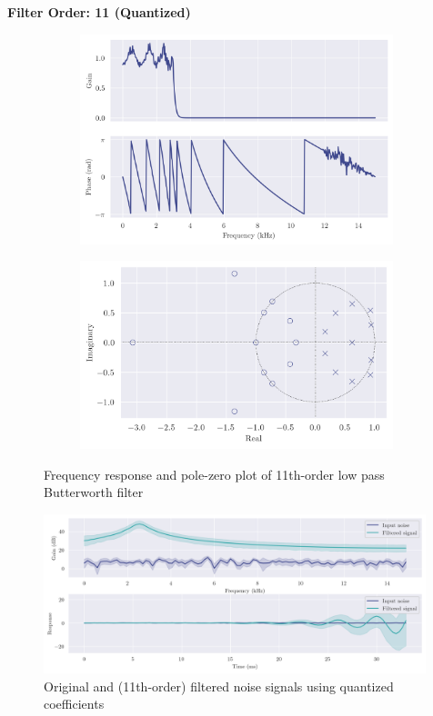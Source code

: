 \newpage
{\Large\textbf{Filter Order: 11 (Quantized)}}
\vspace{1em}

\begin{figure}[ht]
    \centering
    \begin{subfigure}[b]{0.47\textwidth}
        \centering
        \includegraphics[width=\textwidth]{images/q8_q11th_freqz.png}
    \end{subfigure}
    \hfill
    \begin{subfigure}[b]{0.52\textwidth}
        \centering
        \includegraphics[width=\textwidth]{images/q8_q11th_zp.png}
    \end{subfigure}
    \caption{Frequency response and pole-zero plot of 11th-order low pass Butterworth filter}
\end{figure}

\begin{figure}[!ht]
    \centering
    \includegraphics[width=0.99\textwidth]{images/q8_q11th_stability.png}
    \caption{Original and (11th-order) filtered noise signals using quantized coefficients}
\end{figure}

